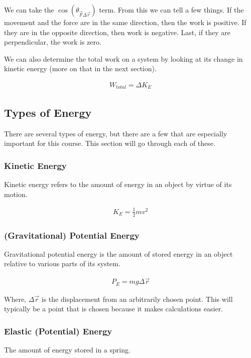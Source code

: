 \documentclass{article}
\begin{document}
\noindent We can take the $\cos(\theta_{\vec{F} \Delta \vec{r}})$ term. From this we
can tell a few things. If the movement and the force are in the same
direction, then the work is positive. If they are in the opposite
direction, then work is negative. Last, if they are perpendicular,
the work is zero.

We can also determine the total work on a system by looking at its
change in kinetic energy (more on that in the next section).

\begin{eqnarray}
    W_{total} = \Delta K_E
\end{eqnarray}

\subsection{Types of Energy}
There are several types of energy, but there are a few that are especially
important for this course. This section will go through each of these.

\subsubsection{Kinetic Energy}
Kinetic energy refers to the amount of energy in an object by
virtue of its motion.

\begin{eqnarray}
    K_E = \frac{1}{2}mv^2
\end{eqnarray}

\subsubsection{(Gravitational) Potential Energy}
Gravitational potential energy is the amount of stored energy in an
object relative to various parts of its system.

\begin{eqnarray}
    P_E = mg \Delta \vec{r}
\end{eqnarray}

\noindent Where, $\Delta \vec{r}$ is the displacement from an arbitrarily
chosen point. This will typically be a point that is chosen because it makes
calculations easier.

\subsubsection{Elastic (Potential) Energy}
The amount of energy stored in a spring.
\end{document}

